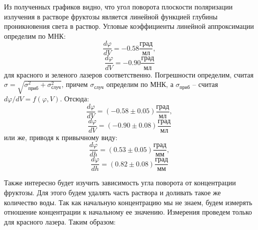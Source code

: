 \documentclass[14pt]{article}
\begin{document}
\begin{flushleft}
\end{flushleft}

Из полученных графиков видно, что угол поворота плоскости поляризации излучения в растворе фруктозы является линейной функцией глубины проникновения света в раствор. Угловые коэффициенты линейной аппроксимации определим по МНК:
$$
	\frac{d\varphi}{dV} = -0.58 \frac{\text{град}}{\text{мл}},
$$
$$
	\frac{d\varphi}{dV} = -0.90 \frac{\text{град}}{\text{мл}}
$$
для красного и зеленого лазеров соответственно. Погрешности определим, считая $\sigma = \sqrt{\sigma_\text{приб}^2 + \sigma_\text{случ}^2}$, причем $\sigma_\text{случ}$ определим по МНК, а $\sigma_\text{приб}$ -- считая $d\varphi/dV = f(\varphi, V)$. Отсюда:
$$
	\frac{d\varphi}{dV} = (-0.58 \pm 0.05) \frac{\text{град}}{\text{мл}},
$$
$$
	\frac{d\varphi}{dV} = (-0.90 \pm 0.08) \frac{\text{град}}{\text{мл}}
$$
или же, приводя к привычному виду:
$$
	\frac{d\varphi}{dh} = (0.53 \pm 0.05)  \frac{\text{град}}{\text{мм}},
$$
$$
	\frac{d\varphi}{dh} = (0.82 \pm 0.08)  \frac{\text{град}}{\text{мм}}
$$

Также интересно будет изучить зависимость угла поворота от концентрации фруктозы. Для этого будем удалять часть раствора и доливать такое же количество воды. Так как начальную концентрацию мы не знаем, будем измерять отношение концентрации к начальному ее значению. Измерения проведем только для красного лазера. Таким образом:
\end{document}
